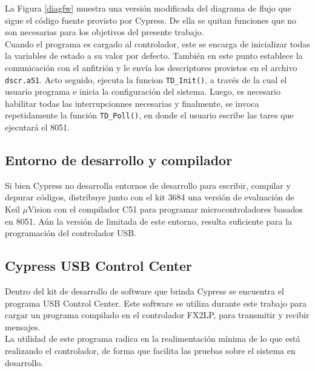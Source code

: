	La Figura \ref{diagfw} muestra una versión modificada del diagrama de flujo que sigue el código fuente provisto por Cypress. De ella se quitan funciones que no son necesarias para los objetivos del presente trabajo.\\
	
	Cuando el programa es cargado al controlador, este se encarga de inicializar todas la variables de estado a su valor por defecto. También en este punto establece la comunicación con el anfitrión y le envía los descriptores provistos en el archivo \verb|dscr.a51|. Acto seguido, ejecuta la funcion \verb|TD_Init()|, a través de la cual el usuario programa e inicia la configuración del sistema. Luego, es necesario habilitar todas las interrupcionnes necesarias y finalmente, se invoca repetidamente la función \verb|TD_Poll()|, en donde el usuario escribe las tares que ejecutará el 8051.\\
	
	\subsection{Entorno de desarrollo y compilador}
	Si bien Cypress no desarrolla entornos de desarrollo para escribir, compilar y depurar códigos, distribuye junto con el kit 3684 una versión de evaluación de Keil $\mu$Vision con el compilador C51 para programar microcontroladores basados en 8051. Aún la versión de limitada de este entorno, resulta suficiente para la programación del controlador USB.\\
	
	\subsection{Cypress USB Control Center}
	Dentro del kit de desarrollo de software que brinda Cypress se encuentra el programa USB Control Center. Este software se utiliza durante este trabajo para cargar un programa compilado en el controlador FX2LP, para transmitir y recibir mensajes.\\
	
	La utilidad de este programa radica en la realimentación mínima de lo que está realizando el controlador, de forma que facilita las pruebas sobre el sistema en desarrollo.\\
	
	